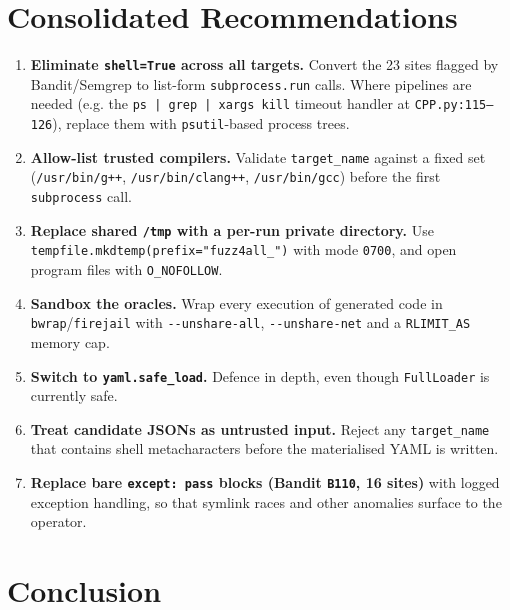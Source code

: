 \documentclass[conference]{IEEEtran}
\begin{document}
\section{Consolidated Recommendations}

\begin{enumerate}[leftmargin=*]
\item \textbf{Eliminate \texttt{shell=True} across all targets.} Convert
the 23 sites flagged by Bandit/Semgrep to list-form
\texttt{subprocess.run} calls. Where pipelines are needed (e.g. the
\texttt{ps | grep | xargs kill} timeout handler at
\texttt{CPP.py:115--126}), replace them with \texttt{psutil}-based
process trees.
\item \textbf{Allow-list trusted compilers.} Validate
\texttt{target\_name} against a fixed set
(\verb|/usr/bin/g++|, \verb|/usr/bin/clang++|, \verb|/usr/bin/gcc|)
before the first \texttt{subprocess} call.
\item \textbf{Replace shared \texttt{/tmp} with a per-run private
directory.} Use \texttt{tempfile.mkdtemp(prefix="fuzz4all\_")} with mode
\texttt{0700}, and open program files with \texttt{O\_NOFOLLOW}.
\item \textbf{Sandbox the oracles.} Wrap every execution of generated
code in \texttt{bwrap}/\texttt{firejail} with \verb|--unshare-all|,
\verb|--unshare-net| and a \verb|RLIMIT_AS| memory cap.
\item \textbf{Switch to \texttt{yaml.safe\_load}.}
Defence in depth, even though \texttt{FullLoader} is currently safe.
\item \textbf{Treat candidate JSONs as untrusted input.} Reject any
\texttt{target\_name} that contains shell metacharacters before the
materialised YAML is written.
\item \textbf{Replace bare \texttt{except: pass} blocks (Bandit
\texttt{B110}, 16 sites)} with logged exception handling, so that
symlink races and other anomalies surface to the operator.
\end{enumerate}

\section{Conclusion}
\end{document}
